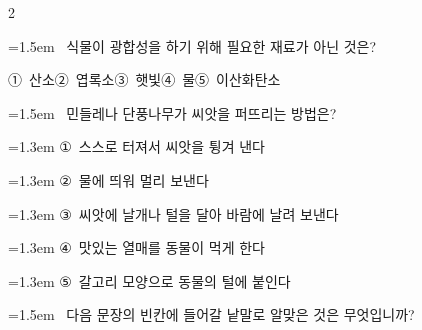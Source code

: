 \documentclass[11pt, a4paper]{article}
\begin{document}
\begin{multicols}{2}
\noindent\begin{minipage}{\columnwidth}
\vspace{2mm}
{\hangindent=1.5em  ~식물이 광합성을 하기 위해 필요한 재료가 아닌 것은?\par}

\vspace{0.5mm}
\noindent
\mbox{①~산소}\hspace{1em}\mbox{②~엽록소}\hspace{1em}\mbox{③~햇빛}\hspace{1em}\mbox{④~물}\hspace{1em}\mbox{⑤~이산화탄소}

\vspace{4mm}
\end{minipage}
\par

\noindent\begin{minipage}{\columnwidth}
\vspace{2mm}
{\hangindent=1.5em  ~민들레나 단풍나무가 씨앗을 퍼뜨리는 방법은?\par}

\vspace{0.5mm}
{\hangindent=1.3em  \noindent\hspace{0.3em}①~스스로 터져서 씨앗을 튕겨 낸다\par}
{\hangindent=1.3em  \noindent\hspace{0.3em}②~물에 띄워 멀리 보낸다\par}
{\hangindent=1.3em  \noindent\hspace{0.3em}③~씨앗에 날개나 털을 달아 바람에 날려 보낸다\par}
{\hangindent=1.3em  \noindent\hspace{0.3em}④~맛있는 열매를 동물이 먹게 한다\par}
{\hangindent=1.3em  \noindent\hspace{0.3em}⑤~갈고리 모양으로 동물의 털에 붙인다\par}
\vspace{4mm}
\end{minipage}
\par

\noindent\begin{minipage}{\columnwidth}
\vspace{2mm}
{\hangindent=1.5em  ~다음 문장의 빈칸에 들어갈 낱말로 알맞은 것은 무엇입니까?\par}


\end{minipage}
\end{multicols}
\end{document}

